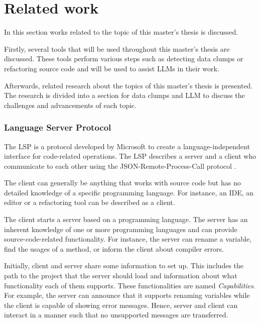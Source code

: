 \section{Related work}\label{sec:related_research}
In this section works related to the topic of this master's thesis is discussed. 

Firstly,  several tools that will be used throughout this master's thesis are discussed. These tools perform various steps such as detecting data clumps or  refactoring source code and will be used to assist \acp{LLM} in their work.

Afterwards, related research about the topics of this master's thesis is presented. The research is divided into a section for data clumps and \ac{LLM} to discuss the challenges and advancements of each topic. 


\subsubsection{Language Server Protocol} \label{sec:lsp}
The \ac{LSP}  \cite{lsp_website} is a protocol developed by Microsoft to create a language-independent interface for code-related operations. 
The \ac{LSP}  describes a server and a client who communicate to each other using the JSON-Remote-Process-Call protocol \cite{json_rpc}. 

The client can generally be anything that works with source code but has no detailed knowledge of a specific programming language. For instance, an \ac{IDE}, an editor or a refactoring tool can be described as a client.

The client starts a server based on a programming language. The server has an inherent knowledge of one or more programming languages and can provide source-code-related functionality. For instance, the server can rename a variable, find the usages of a method, or inform the client about compiler errors. 

Initially, client and server share some information to set up. This includes the path to the project that the server should load and information about what functionality each of them supports. These functionalities are named \textit{Capabilities}. For example, the server can announce that it supports renaming variables while the client is capable of showing error messages. Hence, server and client can interact in a manner such that no unsupported messages are transferred.

